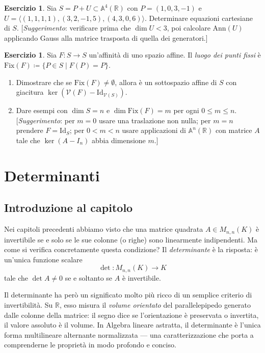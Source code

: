 \documentclass[11pt, a4paper]{book}
\theoremstyle{definition}
\newtheorem{esercizio}[definizione]{Esercizio}
\theoremstyle{plain}
\theoremstyle{remark}
\newcommand{\R}{\mathbb{R}}
\newcommand{\Id}{\mathrm{Id}}
\newcommand{\Ann}{\mathrm{Ann}}
\newcommand{\VV}{\mathcal{V}}   %
\begin{document}
\begin{esercizio}
\label{es:ann-eq-cart}
Sia $S = P + U \subset \mathbb{A}^4(\R)$ con $P = (1,0,3,-1)$ e $U = \langle (1,1,1,1), (3,2,-1,5), (4,3,0,6) \rangle$. Determinare equazioni cartesiane di $S$. [\emph{Suggerimento}: verificare prima che $\dim U < 3$, poi calcolare $\Ann(U)$ applicando Gauss alla matrice trasposta di quella dei generatori.]
\end{esercizio}

\begin{esercizio}
Sia $F \colon S \to S$ un'affinità di uno spazio affine. Il \emph{luogo dei punti fissi} è $\mathrm{Fix}(F) \coloneqq \{P \in S \mid F(P) = P\}$.
\begin{enumerate}
  \item Dimostrare che se $\mathrm{Fix}(F) \neq \emptyset$, allora è un sottospazio affine di $S$ con giacitura $\ker(\VV(F) - \Id_{\VV(S)})$.
  \item Dare esempi con $\dim S = n$ e $\dim \mathrm{Fix}(F) = m$ per ogni $0 \leq m \leq n$. [\emph{Suggerimento}: per $m = 0$ usare una traslazione non nulla; per $m = n$ prendere $F = \Id_S$; per $0 < m < n$ usare applicazioni di $\mathbb{A}^n(\R)$ con matrice $A$ tale che $\ker(A - I_n)$ abbia dimensione $m$.]
\end{enumerate}
\end{esercizio}


\chapter{Determinanti}
\label{cap:determinanti}

\section*{Introduzione al capitolo}

Nei capitoli precedenti abbiamo visto che una matrice quadrata $A \in M_{n,n}(K)$ è invertibile se e solo se le sue colonne (o righe) sono linearmente indipendenti. Ma come si verifica concretamente questa condizione? Il \emph{determinante} è la risposta: è un'unica funzione scalare
\[
  \det \colon M_{n,n}(K) \longrightarrow K
\]
tale che $\det A \neq 0$ se e soltanto se $A$ è invertibile.

Il determinante ha però un significato molto più ricco di un semplice criterio di invertibilità. Su $\R$, esso misura il \emph{volume orientato} del parallelepipedo generato dalle colonne della matrice: il segno dice se l'orientazione è preservata o invertita, il valore assoluto è il volume. In Algebra lineare astratta, il determinante è l'unica forma multilineare alternante normalizzata — una caratterizzazione che porta a comprenderne le proprietà in modo profondo e conciso.
\end{document}
